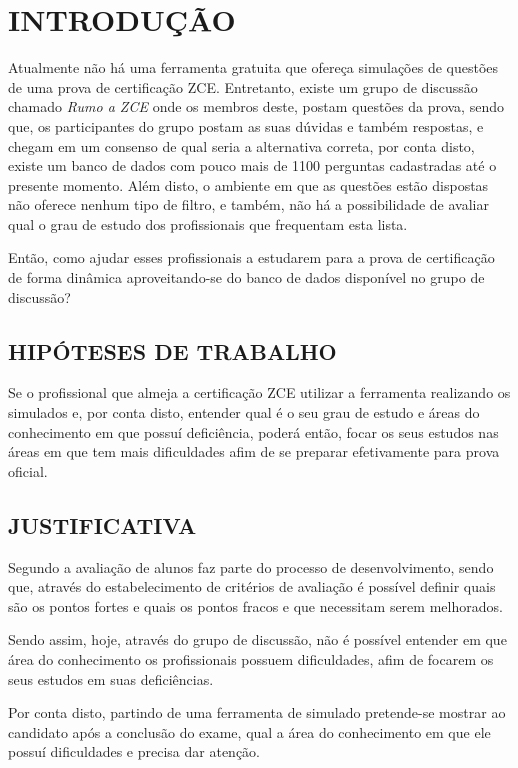 \chapter{INTRODUÇÃO}
\label{chp:intro}

Atualmente não há uma ferramenta gratuita que ofereça simulações de questões de 
uma prova de certificação \ac{ZCE}. Entretanto, existe um 
grupo de discussão chamado \textit{Rumo a ZCE} onde os membros deste, postam
questões da prova, sendo que, os participantes do grupo postam as suas dúvidas 
e também respostas, e chegam em um consenso de qual seria a alternativa correta,
por conta disto, existe um banco de dados com pouco mais de 1100 perguntas 
cadastradas até o presente momento. Além disto, o ambiente em que as questões 
estão dispostas não oferece nenhum tipo de filtro, e também, não há a 
possibilidade de avaliar qual o grau de estudo dos profissionais que frequentam 
esta lista.

Então, como ajudar esses profissionais a estudarem para a prova de certificação 
de forma dinâmica aproveitando-se do banco de dados disponível no grupo de 
discussão?

\section{HIPÓTESES DE TRABALHO}

Se o profissional que almeja a certificação \acs{ZCE} utilizar a ferramenta
realizando os simulados e, por conta disto, entender qual é o seu grau de estudo e áreas 
do conhecimento em que possuí deficiência, poderá então, focar os seus estudos 
nas áreas em que tem mais dificuldades afim de se preparar efetivamente para 
prova oficial.

\section{JUSTIFICATIVA}

Segundo  a avaliação de  alunos
faz parte do processo de desenvolvimento, sendo que, através do estabelecimento 
de critérios de avaliação é possível definir quais são os pontos fortes e  quais
os pontos fracos e que necessitam serem melhorados.

Sendo assim, hoje, através do grupo de discussão, não é possível entender em 
que área do conhecimento os profissionais possuem dificuldades, afim de focarem
os seus estudos em suas deficiências.

Por conta disto, partindo de uma ferramenta de simulado pretende-se mostrar ao
candidato após a conclusão do exame, qual a área do conhecimento em que ele 
possuí dificuldades e precisa dar atenção.

